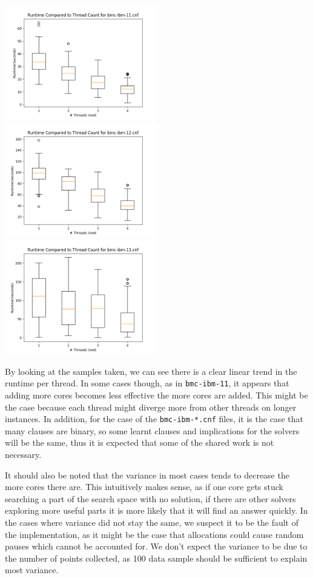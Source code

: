 \documentclass[11pt]{extarticle}
\begin{document}
\includegraphics[width=0.5\textwidth]{figures/bmc-ibm-11.png}
\includegraphics[width=0.5\textwidth]{figures/bmc-ibm-12.png}
\includegraphics[width=0.5\textwidth]{figures/bmc-ibm-13.png}


By looking at the samples taken, we can see there is a clear linear trend in the runtime per
thread. In some cases though, as in \texttt{bmc-ibm-11}, it appears that adding more cores
becomes less effective the more cores are added. This might be the case because each thread
might diverge more from other threads on longer instances. In addition, for the case of the
\texttt{bmc-ibm-*.cnf} files, it is the case that many clauses are binary, so some learnt clauses
and implications for the solvers will be the same, thus it is expected that some of the shared
work is not necessary.

It should also be noted that the variance in most cases tends to decrease the more cores there
are. This intuitively makes sense, as if one core gets stuck searching a part of the search
space with no solution, if there are other solvers exploring more useful parts it is more likely
that it will find an answer quickly. In the cases where variance did not stay the same, we
suspect it to be the fault of the implementation, as it might be the case that allocations could
cause random pauses which cannot be accounted for. We don't expect the variance to be due to the
number of points collected, as 100 data sample should be sufficient to explain most variance.
\end{document}
